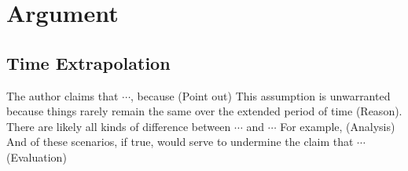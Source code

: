 \section{Argument}
\subsection{Time Extrapolation}
The author claims that \(\cdots\), because ({\color{red}Point out})
This assumption is unwarranted because things rarely remain the same over the extended period of time ({\color{red}Reason}).
There are likely all kinds of difference between \(\cdots\) and \(\cdots\)
For example, ({\color{red}Analysis})
And of these scenarios, if true, would serve to undermine the claim that \(\cdots\) ({\color{red}Evaluation})